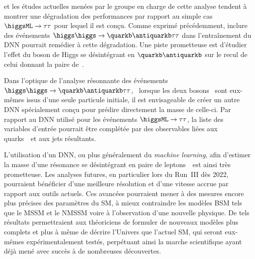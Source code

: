 et
les études actuelles menées par le groupe en charge de cette analyse
tendent à montrer une dégradation des performances par rapport au simple cas $\higgsML\to\tau\tau$
pour lequel il est conçu.
Comme exprimé précédemment,
inclure des événements $\higgs\higgs\to\quarkb\antiquarkb\tau\tau$
dans l'entraînement du DNN pourrait remédier à cette dégradation.
Une piste prometteuse est d'étudier l'effet du boson de Higgs se désintégrant en $\quarkb\antiquarkb$ sur le recul de celui donnant la paire de~\tau.
\par
Dans l'optique de l'analyse \og résonnante \fg{} des événements
$\higgs\higgs\to\quarkb\antiquarkb\tau\tau$,
\ie\ lorsque les deux bosons \higgs\ sont eux-mêmes issus d'une seule particule initiale,
il est envisageable de créer un autre DNN
spécialement conçu pour prédire directement la masse de celle-ci.
Par rapport au DNN utilisé pour les événements $\higgsML\to\tau\tau$,
la liste des variables d'entrée pourrait être complétée
par des observables liées aux quarks~\quarkb\ et aux jets résultants.
\par
L'utilisation d'un DNN, ou plus généralement du \emph{machine learning}, afin d'estimer la masse d'une résonance se désintégrant en paire de leptons~\tau\
est ainsi très prometteuse.
Les analyses futures, en particulier lors du Run~III dès 2022,
pourraient bénéficier d'une meilleure résolution et d'une vitesse accrue par rapport aux outils actuels.
Ces avancées pourraient mener
à des mesures encore plus précises des paramètres du SM,
à mieux contraindre les modèles BSM tels que le MSSM et le NMSSM
voire
à l'observation d'une nouvelle physique.
De tels résultats permettraient aux théoriciens de formuler de nouveaux modèles
plus complets
et plus à même de décrire l'Univers
que l'actuel SM,
qui seront eux-mêmes expérimentalement testés,
perpétuant ainsi la marche scientifique
ayant déjà mené avec succès à de nombreuses découvertes.